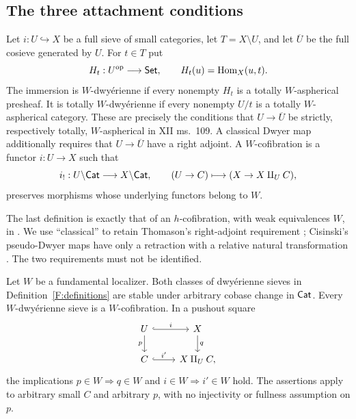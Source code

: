 \subsection{The three attachment conditions}

\begin{definition}\label{F:definitions}
Let $i:U\hookrightarrow X$ be a full sieve of small categories, let
$T=X\setminus U$, and let $\overline U$ be the full cosieve generated by
$U$. For $t\in T$ put
\[
 H_t:U^{\mathrm{op}}\longrightarrow\mathsf{Set},\qquad H_t(u)=\operatorname{Hom}_X(u,t).
\]
The immersion is $W$-dwy\'erienne if every nonempty $H_t$ is a totally
$W$-aspherical presheaf. It is totally $W$-dwy\'erienne if every nonempty
$U/t$ is a totally $W$-aspherical category. These are precisely the
conditions that $U\to\overline U$ be strictly, respectively totally,
$W$-aspherical in XII ms.~109. A classical Dwyer map additionally requires
that $U\to\overline U$ have a right adjoint. A $W$-cofibration is a functor
$i:U\to X$ such that
\[
 i_!:U\backslash\mathsf{Cat}\longrightarrow X\backslash\mathsf{Cat},
 \qquad (U\to C)\longmapsto(X\to X\amalg_U C),
\]
preserves morphisms whose underlying functors belong to $W$.
\end{definition}

The last definition is exactly that of an $h$-cofibration, with weak
equivalences $W$, in \citet[Definition~1.1]{F_BataninBerger2017}. We use
``classical'' to retain Thomason's right-adjoint requirement
\citep[Definition~4.1]{F_Thomason1980}; Cisinski's pseudo-Dwyer maps have
only a retraction with a relative natural transformation
\citep[Definition~1]{F_Cisinski1999}. The two requirements must not be
identified.

\begin{proposition}\label{F:pushout}
Let $W$ be a fundamental localizer. Both classes of dwy\'erienne sieves
in Definition~\ref{F:definitions} are stable under arbitrary cobase change
in $\mathsf{Cat}$. Every $W$-dwy\'erienne sieve is a $W$-cofibration. In a pushout
square
\[
\begin{tikzcd}
 U\arrow[r,"i",hook]\arrow[d,"p"']&X\arrow[d,"q"]\\
 C\arrow[r,"i'",hook]&X\amalg_U C,
\end{tikzcd}
\]
the implications $p\in W\Rightarrow q\in W$ and
$i\in W\Rightarrow i'\in W$ hold. The assertions apply to arbitrary
small $C$ and arbitrary $p$, with no injectivity or fullness assumption
on $p$.
\end{proposition}

